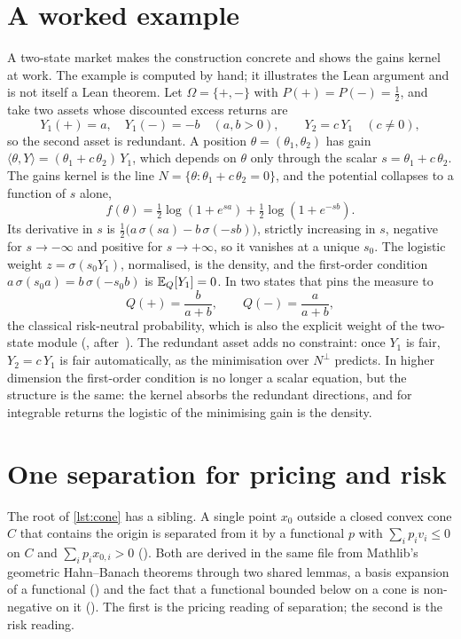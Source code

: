 \documentclass[11pt]{article}
\begin{document}
\section{A worked example}\label{sec:example}

A two-state market makes the construction concrete and shows the gains kernel at work. The example is
computed by hand; it illustrates the Lean argument and is not itself a Lean theorem. Let
$\Omega=\{+,-\}$ with $P(+)=P(-)=\tfrac12$, and take two assets whose discounted excess returns are
\[
  Y_1(+)=a,\quad Y_1(-)=-b\quad(a,b>0),\qquad Y_2=c\,Y_1\quad(c\neq0),
\]
so the second asset is redundant. A position $\theta=(\theta_1,\theta_2)$ has gain
$\langle\theta,Y\rangle=(\theta_1+c\,\theta_2)\,Y_1$, which depends on $\theta$ only through the scalar
$s=\theta_1+c\,\theta_2$. The gains kernel is the line $N=\{\theta:\theta_1+c\,\theta_2=0\}$, and the
potential collapses to a function of $s$ alone,
\[
  f(\theta)=\tfrac12\log(1+e^{sa})+\tfrac12\log(1+e^{-sb}).
\]
Its derivative in $s$ is $\tfrac12\bigl(a\,\sigma(sa)-b\,\sigma(-sb)\bigr)$, strictly increasing in $s$,
negative for $s\to-\infty$ and positive for $s\to+\infty$, so it vanishes at a unique $s_0$. The logistic
weight $z=\sigma(s_0Y_1)$, normalised, is the density, and the first-order condition
$a\,\sigma(s_0a)=b\,\sigma(-s_0b)$ is $\mathbb{E}_Q[Y_1]=0$. In two states that pins the measure to
\[
  Q(+)=\frac{b}{a+b},\qquad Q(-)=\frac{a}{a+b},
\]
the classical risk-neutral probability, which is also the explicit weight of the two-state module
(, after~\cite{Nagy2026}). The redundant asset adds no constraint: once $Y_1$ is fair,
$Y_2=c\,Y_1$ is fair automatically, as the minimisation over $N^\perp$ predicts. In higher dimension the
first-order condition is no longer a scalar equation, but the structure is the same: the kernel absorbs
the redundant directions, and for integrable returns the logistic of the minimising gain is the density.

\section{One separation for pricing and risk}\label{sec:separation}

The root of \cref{lst:cone} has a sibling. A single point $x_0$ outside a closed convex cone $C$ that
contains the origin is separated from it by a functional $p$ with $\sum_ip_iv_i\le0$ on $C$ and
$\sum_ip_ix_{0,i}>0$ (). Both are derived in the same file from
Mathlib's geometric Hahn--Banach theorems through two shared lemmas, a basis expansion of a functional
() and the fact that a functional bounded below on a cone is non-negative on it
(). The first is the pricing reading of separation; the second is the risk reading.
\end{document}
